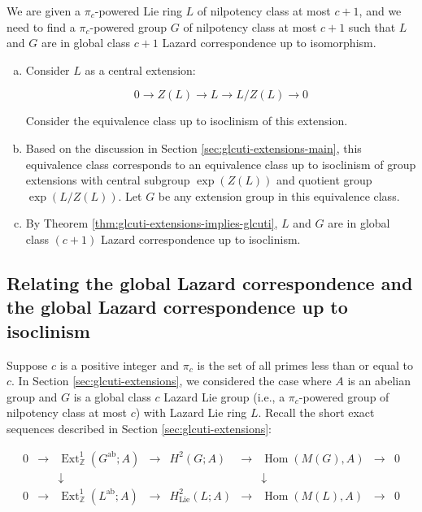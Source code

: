 \documentclass{ucetd}
\begin{document}
We are given a $\pi_c$-powered Lie ring $L$ of nilpotency class at
most $c + 1$, and we need to find a $\pi_c$-powered group $G$ of
nilpotency class at most $c + 1$ such that $L$ and $G$ are in global
class $c + 1$ Lazard correspondence up to isomorphism.

\begin{enumerate}[(a)]
\item Consider $L$ as a central extension:

  $$0 \to Z(L) \to L \to L/Z(L) \to 0$$

  Consider the equivalence class up to isoclinism of this extension.

\item Based on the discussion in Section
  \ref{sec:glcuti-extensions-main}, this equivalence class corresponds
  to an equivalence class up to isoclinism of group extensions with
  central subgroup $\exp(Z(L))$ and quotient group $\exp(L/Z(L))$. Let
  $G$ be any extension group in this equivalence class.

\item By Theorem \ref{thm:glcuti-extensions-implies-glcuti}, $L$ and
  $G$ are in global class $(c + 1)$ Lazard correspondence up to
  isoclinism.
\end{enumerate}

\subsection{Relating the global Lazard correspondence and the global Lazard correspondence up to isoclinism}

Suppose $c$ is a positive integer and $\pi_c$ is the set of all primes
less than or equal to $c$. In Section \ref{sec:glcuti-extensions}, we
considered the case where $A$ is an abelian group and $G$ is a global
class $c$ Lazard Lie group (i.e., a $\pi_c$-powered group of nilpotency
class at most $c$) with Lazard Lie ring $L$. Recall the short exact
sequences described in Section \ref{sec:glcuti-extensions}:

$$\begin{array}{ccccccccc}
  0 &\to &\operatorname{Ext}^1_{\mathbb{Z}}(G^{\operatorname{ab}};A) &\to &H^2(G;A) &\to &\operatorname{Hom}(M(G),A) &\to &0\\
  & & \downarrow & & & & \downarrow & & \\
  0 &\to &\operatorname{Ext}^1_{\mathbb{Z}}(L^{\operatorname{ab}};A) & \to & H^2_{\text{Lie}}(L;A) & \to & \operatorname{Hom}(M(L), A) & \to & 0\\
\end{array}$$
\end{document}
